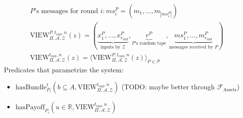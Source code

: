  \begin{gather*}
    P\text{'s messages for round } i: ms^P_i = \left(m_1, \dots, m_{|ms^P_i|}\right) \\
    \mathrm{VIEW}^{P, t_{\mathrm{end}}, n}_{\Pi, \mathcal{A}, \mathcal{Z}}\left(z\right) =
    \left(\underbrace{x^P_1, \dots, x^P_{r_{\mathrm{end}}}}_{\text{inputs by }
    \mathcal{Z}}, \underbrace{r^P}_{P\text{'s random tape}}, \underbrace{ms^P_1, \dots,
    m^P_{r_{\mathrm{end}}}}_{\text{messages received by } P}\right) \\
    \mathrm{VIEW}^{t_{\mathrm{end}}, n}_{\Pi, \mathcal{A}, \mathcal{Z}}\left(z\right) =
    \langle\mathrm{VIEW}^{P, t_{\mathrm{end}}, n}_{\Pi, \mathcal{A},
    \mathcal{Z}}\left(z\right)\rangle_{P \in \mathcal{P}}
  \end{gather*}
  Predicates that parametrize the system:
  \begin{itemize}
    \item $\mathrm{hasBundle}_{P_i}^t\left(b \subseteq A, \mathrm{VIEW}_{\Pi, \mathcal{A},
    \mathcal{Z}}^{t_{\mathrm{end}}, n}\right)$ (TODO: maybe better through
    $\mathcal{F}_{\mathrm{Assets}}$)
    \item $\mathrm{hasPayoff}_{P_i}\left(u \in \mathbb{R}, \mathrm{VIEW}_{\Pi, \mathcal{A},
    \mathcal{Z}}^{t_{\mathrm{end}}, n}\right)$
  \end{itemize}
